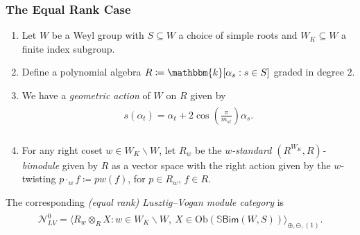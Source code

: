 \documentclass{beamer}
\newcommand{\obset}{\mathrm{Ob}}
\newcommand{\textcat}[1]{\mathrm{\textsf{#1}}}
\newcommand*{\emphasis}[1]{\textcolor{structure}{\em #1}}
\begin{document}
\begin{frame}
\frametitle{The Equal Rank Case}
\begin{enumerate}
\item Let $W$ be a Weyl group with $S \subseteq W$ a choice of simple roots and $W_K \subseteq W$ a finite index subgroup.
\item Define a polynomial algebra $R \coloneqq \mathbbm{k}[\alpha_s : s \in S]$ graded in degree $2$.
\item We have a \emphasis{geometric action} of $W$ on $R$ given by\\[-4ex]
\begin{align*}
\begin{split}
s(\alpha_t) = \alpha_t + 2\cos\!\left(\frac{\pi}{m_{st}}\right)\!\alpha_s.\\[-1ex]
\end{split}
\end{align*}
\item For any right coset $w \in W_K\backslash W$, let $R_w$ be the \emphasis{$w$-standard $(R^{W_K}, R)$-bimodule} given by $R$ as a vector space with the right action given by the $w$-twisting $p \cdot_w f \coloneqq pw(f)$, for $p \in R_w$, $f \in R$.
\end{enumerate}
\begin{definition}[\aycite{LR22}] The corresponding \emphasis{(equal rank) Lusztig--Vogan module category} is\\[-4ex]
\begin{align*}
\begin{split}
\mathcal{N}_{LV}^0 = \langle R_w \otimes_R X : w \in W_K\backslash W,\ X \in \obset(\mathbb{S}\textcat{Bim}(W, S))\rangle_{\oplus,\ominus,(1)}.
\end{split}
\end{align*}
\end{definition}
\end{frame}
\end{document}
